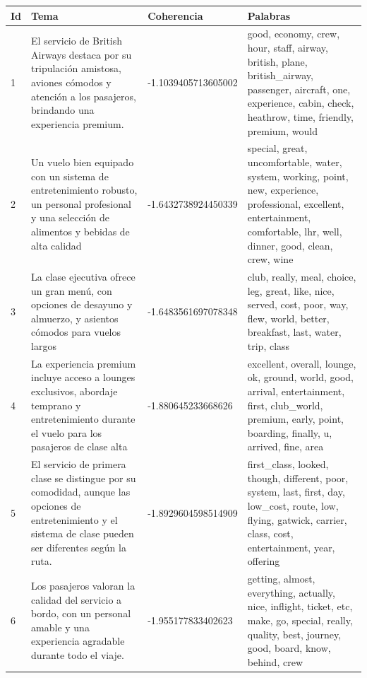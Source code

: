 \documentclass{report}
\begin{document}
                \begin{longtable}{|p{1cm}|p{4cm}|p{4cm}|p{6cm}|}
                    \hline
                    \textbf{Id} & \textbf{Tema} & \textbf{Coherencia} & \textbf{Palabras} \\
                    \hline
                    1 & El servicio de British Airways destaca por su tripulación amistosa, aviones cómodos y atención a los pasajeros, brindando una experiencia premium. & -1.1039405713605002 & good, economy, crew, hour, staff, airway, british, plane, british\_airway, passenger, aircraft, one, experience, cabin, check, heathrow, time, friendly, premium, would \\
                    \hline
                    2 & Un vuelo bien equipado con un sistema de entretenimiento robusto, un personal profesional y una selección de alimentos y bebidas de alta calidad & -1.6432738924450339 & special, great, uncomfortable, water, system, working, point, new, experience, professional, excellent, entertainment, comfortable, lhr, well, dinner, good, clean, crew, wine \\
                    \hline
                    3 & La clase ejecutiva ofrece un gran menú, con opciones de desayuno y almuerzo, y asientos cómodos para vuelos largos & -1.6483561697078348 & club, really, meal, choice, leg, great, like, nice, served, cost, poor, way, flew, world, better, breakfast, last, water, trip, class \\
                    \hline
                    4 & La experiencia premium incluye acceso a lounges exclusivos, abordaje temprano y entretenimiento durante el vuelo para los pasajeros de clase alta & -1.880645233668626 & excellent, overall, lounge, ok, ground, world, good, arrival, entertainment, first, club\_world, premium, early, point, boarding, finally, u, arrived, fine, area \\
                    \hline
                    5 & El servicio de primera clase se distingue por su comodidad, aunque las opciones de entretenimiento y el sistema de clase pueden ser diferentes según la ruta. & -1.8929604598514909 & first\_class, looked, though, different, poor, system, last, first, day, low\_cost, route, low, flying, gatwick, carrier, class, cost, entertainment, year, offering \\
                    \hline
                    6 & Los pasajeros valoran la calidad del servicio a bordo, con un personal amable y una experiencia agradable durante todo el viaje. & -1.955177833402623 & getting, almost, everything, actually, nice, inflight, ticket, etc, make, go, special, really, quality, best, journey, good, board, know, behind, crew \\

\end{longtable}
\end{document}
